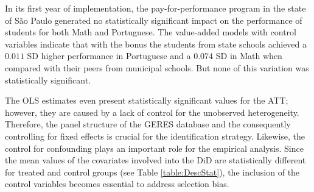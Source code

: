 \documentclass[a4paper, 12pt]{article}
\begin{document}
  
In its first year of implementation, the pay-for-performance program in the state of São Paulo generated no statistically significant impact on the performance of students for both Math and Portuguese. The value-added models with control variables indicate that with the bonus the students from state schools achieved a $0.011$ SD higher performance in Portuguese and a $0.074$ SD in Math when compared with their peers from municipal schools. But none of this variation was statistically significant.

The OLS estimates even present statistically significant values for the ATT; however, they are caused by a lack of control for the unobserved heterogeneity. Therefore, the panel structure of the GERES database and the consequently controlling for fixed effects is crucial for the identification strategy. Likewise, the control for confounding plays an important role for the empirical analysis. Since the mean values of the covariates involved into the DiD are statistically different for treated and control groups (see Table \ref{table:DescStat}), the inclusion of the control variables becomes essential to address selection bias.




 
 
\end{document}
